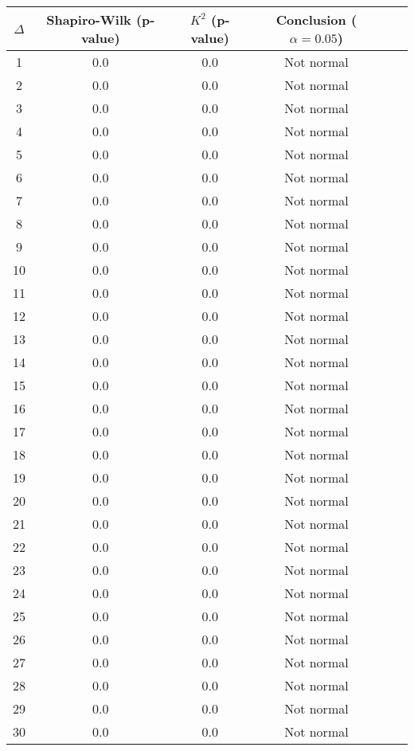 \begin{table}[h]
	\begin{tabular}{|c|c|c|c|c|c|}
		\hline
		$\Delta$ & Shapiro-Wilk (p-value) & $K^2$ (p-value) & Conclusion ($\alpha = 0.05$)\\\hline
		\hline
		1 & 0.0 & 0.0 & Not normal\\\hline
		2 & 0.0 & 0.0 & Not normal\\\hline
		3 & 0.0 & 0.0 & Not normal\\\hline
		4 & 0.0 & 0.0 & Not normal\\\hline
		5 & 0.0 & 0.0 & Not normal\\\hline
		6 & 0.0 & 0.0 & Not normal\\\hline
		7 & 0.0 & 0.0 & Not normal\\\hline
		8 & 0.0 & 0.0 & Not normal\\\hline
		9 & 0.0 & 0.0 & Not normal\\\hline
		10 & 0.0 & 0.0 & Not normal\\\hline
		11 & 0.0 & 0.0 & Not normal\\\hline
		12 & 0.0 & 0.0 & Not normal\\\hline
		13 & 0.0 & 0.0 & Not normal\\\hline
		14 & 0.0 & 0.0 & Not normal\\\hline
		15 & 0.0 & 0.0 & Not normal\\\hline
		16 & 0.0 & 0.0 & Not normal\\\hline
		17 & 0.0 & 0.0 & Not normal\\\hline
		18 & 0.0 & 0.0 & Not normal\\\hline
		19 & 0.0 & 0.0 & Not normal\\\hline
		20 & 0.0 & 0.0 & Not normal\\\hline
		21 & 0.0 & 0.0 & Not normal\\\hline
		22 & 0.0 & 0.0 & Not normal\\\hline
		23 & 0.0 & 0.0 & Not normal\\\hline
		24 & 0.0 & 0.0 & Not normal\\\hline
		25 & 0.0 & 0.0 & Not normal\\\hline
		26 & 0.0 & 0.0 & Not normal\\\hline
		27 & 0.0 & 0.0 & Not normal\\\hline
		28 & 0.0 & 0.0 & Not normal\\\hline
		29 & 0.0 & 0.0 & Not normal\\\hline
		30 & 0.0 & 0.0 & Not normal\\\hline

\end{tabular}
\end{table}
